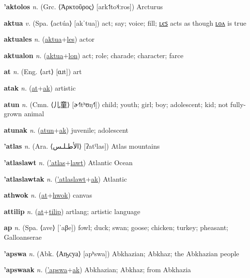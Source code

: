 \textbf{\hypertarget{'aktolos}{'aktolos}} \textit{n.} (Grc. ⟨Ἀρκτοῦρος⟩ [ark˦to˦˨ːros])
Arcturus

\textbf{\hypertarget{aktua}{aktua}} \textit{v.} (Spa. ⟨actúa⟩ [akˈtua])
act; say; voice; fill; \hyperlink{aktuales}{ʟєꜱ} acts as though \hyperlink{aktualon}{ʟᴏᴧ} is true

\textbf{\hypertarget{aktuales}{aktuales}} \textit{n.} (\hyperlink{aktua}{aktua}+\allowbreak \hyperlink{les}{les})
actor

\textbf{\hypertarget{aktualon}{aktualon}} \textit{n.} (\hyperlink{aktua}{aktua}+\allowbreak \hyperlink{lon}{lon})
act; role; charade; character; farce

\textbf{\hypertarget{at}{at}} \textit{n.} (Eng. ⟨art⟩ [ɑɹt])
art

\textbf{\hypertarget{atak}{atak}} \textit{n.} (\hyperlink{at}{at}+\allowbreak \hyperlink{ak}{ak})
artistic

\textbf{\hypertarget{atun}{atun}} \textit{n.} (Cmn. ⟨{\chinese{}儿童}⟩ [ɚ˧˥tʰʊŋ˧˥])
child; youth; girl; boy; adolescent; kid; not fully-grown animal

\textbf{\hypertarget{atunak}{atunak}} \textit{n.} (\hyperlink{atun}{atun}+\allowbreak \hyperlink{ak}{ak})
juvenile; adolescent

\textbf{\hypertarget{'atlas}{'atlas}} \textit{n.} (Ara. ⟨{\arabics{}الأطـلـس‎}⟩ [ʔatˤlas])
Atlas mountains

\textbf{\hypertarget{'atlaslawt}{'atlaslawt}} \textit{n.} (\hyperlink{'atlas}{'atlas}+\allowbreak \hyperlink{lawt}{lawt})
Atlantic Ocean

\textbf{\hypertarget{'atlaslawtak}{'atlaslawtak}} \textit{n.} (\hyperlink{'atlaslawt}{'atlaslawt}+\allowbreak \hyperlink{ak}{ak})
Atlantic

\textbf{\hypertarget{athwok}{athwok}} \textit{n.} (\hyperlink{at}{at}+\allowbreak \hyperlink{hwok}{hwok})
canvas

\textbf{\hypertarget{attilip}{attilip}} \textit{n.} (\hyperlink{at}{at}+\allowbreak \hyperlink{tilip}{tilip})
artlang; artistic language

\textbf{\hypertarget{ap}{ap}} \textit{n.} (Spa. ⟨ave⟩ [ˈaβe])
fowl; duck; swan; goose; chicken; turkey; pheasant; Galloanserae

\textbf{\hypertarget{'apswa}{'apswa}} \textit{n.} (Abk. ⟨Аҧсуа⟩ [apʰswa])
Abkhazian; Abkhaz; the Abkhazian people

\textbf{\hypertarget{'apswaak}{'apswaak}} \textit{n.} (\hyperlink{'apswa}{'apswa}+\allowbreak \hyperlink{ak}{ak})
Abkhazian; Abkhaz; from Abkhazia

